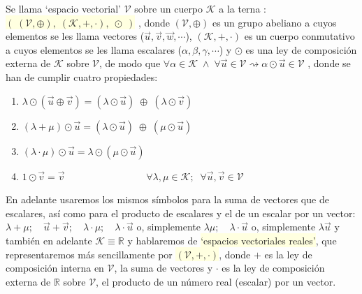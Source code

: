 \begin{definition} 

Se llama `espacio vectorial' $\mathcal V$ sobre un cuerpo $\mathcal K$ a la terna : $\; \; $ \colorbox{LightYellow}{$\displaystyle \left( \; (\mathcal V, \oplus),\; (\mathcal K,+,\cdot),\; \odot \;  \right) $} , donde $(\mathcal V, \oplus)$ es un grupo abeliano a cuyos elementos se les llama vectores ($\vec u, \vec v, \vec w, \cdots  $), $(\mathcal K, +, \cdot)$ es un cuerpo conmutativo a cuyos elementos se les llama escalares ($\alpha, \beta, \gamma, \cdots$) y $\odot$ es una ley de composición externa de $\mathcal K$ sobre $\mathcal V$, de modo que $\forall \alpha \in \mathcal K \; \wedge \; \forall \vec u \in \mathcal V \rightsquigarrow \alpha \odot \vec u \in \mathcal V$ , donde se han de cumplir cuatro propiedades:

\begin{enumerate}[EV.1. ]

\item $\lambda \odot (\vec u \oplus \vec v)= (\lambda \odot \vec u) \; \oplus \; (\lambda \odot \vec v)$
\item $(\lambda + \mu)\odot \vec u = (\lambda \odot \vec u) \; \oplus \; (\mu \odot \vec u)$
\item  $(\lambda \cdot \mu)\odot \vec u = \lambda \odot (\mu \odot \vec u)$
\item $1\odot \vec v = \vec v$
$\qquad \qquad \qquad \qquad \forall \lambda, \mu \in \mathcal K; \; \; \forall \vec u, \vec v \in \mathcal V$	
\end{enumerate}
\end{definition}

En adelante usaremos los mismos símbolos para la suma de vectores que de escalares, así como para el producto de escalares y el de un escalar por un vector: $\lambda + \mu; \quad \vec u + \vec v; \quad \lambda \cdot \mu; \quad \lambda \cdot \vec u$ o, simplemente $\lambda \mu; \quad \lambda \cdot \vec u$ o, simplemente $\lambda \vec u$ y también en adelante $\mathcal K \equiv \mathbb R$ y hablaremos de \colorbox{LightYellow}{`espacios vectoriales reales'}, que representaremos más sencillamente por \colorbox{LightYellow}{$(\mathcal V, +, \cdot)$},  donde $+$ es la ley de composición interna en $\mathcal V$, la suma de vectores y $\cdot$  es la ley de composición externa de $\mathbb R$ sobre $\mathcal V$, el producto de un número real (escalar) por un vector.

